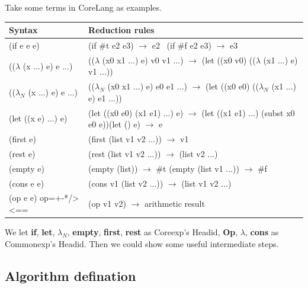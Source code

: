 Take some terms in CoreLang as examples. 

\begin{flushleft}
\begin{tabularx}{\textwidth}%
{|>{\setlength{\hsize}{.4\hsize}\centering\arraybackslash}X  |>{\setlength{\hsize}{1.6\hsize}\centering\arraybackslash}X|}
\hline
Syntax & Reduction rules \\ \hline
(if e e e) &\qquad\qquad\qquad(if \#t e2 e3) $\rightarrow$ e2 \newline ~(if \#f e2 e3) $\rightarrow$ e3\\ \hline
(($\lambda$ (x ...) e) e ...) & (($\lambda$ (x0 x1 ...) e) v0 v1 ...) $\rightarrow$ (let ((x0 v0) (($\lambda$ (x1 ...) e) v1 ...))\\ \hline
(($\lambda_N$ (x ...) e) e ...) & (($\lambda_N$ (x0 x1 ...) e) e0 e1 ...) $\rightarrow$ (let ((x0 e0) (($\lambda_N$ (x1 ...) e) e1 ...))\\ \hline
(let ((x e) ...) e) & (let ((x0 e0) (x1 e1) ...) e) $\rightarrow$ (let ((x1 e1) ...) (subst x0 e0 e))\newline (let () e) $\rightarrow$ e\\ \hline
(first e) & (first (list v1 v2 ...)) $\rightarrow$ v1\\ \hline
(rest e) & (rest (list v1 v2 ...)) $\rightarrow$ (list v2 ...)\\ \hline
(empty e) & \qquad\qquad\qquad(empty (list)) $\rightarrow$ \#t \newline (empty (list v1 ...)) $\rightarrow$ \#f\\ \hline
(cons e e) & (cons v1 (list v2 ...)) $\rightarrow$ (list v1 v2 ...)\\ \hline
(op e e) \newline op=+-*/><== & (op v1 v2) $\rightarrow$ arithmetic result\\ \hline
\end{tabularx}
\end{flushleft}

We let {\bfseries if}, {\bfseries let}, {\bfseries $\lambda _{N}$}, {\bfseries empty}, {\bfseries first}, {\bfseries rest} as Coreexp's Headid, {\bfseries Op}, {\bfseries $\lambda$}, {\bfseries cons} as Commonexp's Headid. Then we could show some useful intermediate steps.


\subsection{Algorithm defination}


